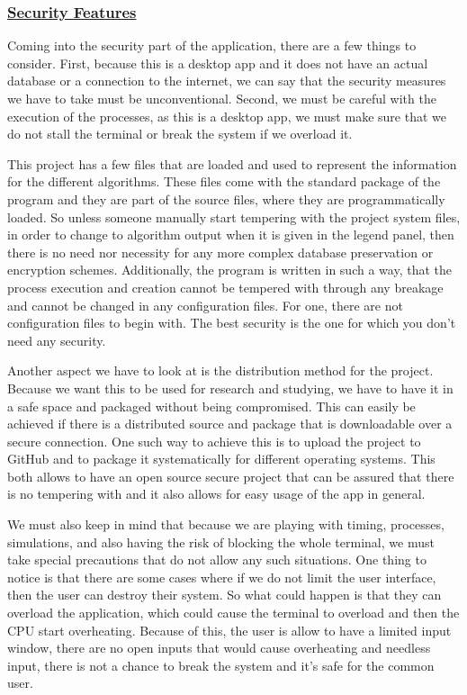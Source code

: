 \documentclass{article}
\begin{document}
\subsubsection{\underline{Security Features}}

Coming into the security part of the application, there are a few things to consider. First, because this is a desktop app and it does not have an actual database or a connection to the internet, we can say that the security measures we have to take must be unconventional. Second, we must be careful with the execution of the processes, as this is a desktop app, we must make sure that we do not stall the terminal or break the system if we overload it.

This project has a few files that are loaded and used to represent the information for the different algorithms. These files come with the standard package of the program and they are part of the source files, where they are programmatically loaded. So unless someone manually start tempering with the project system files, in order to change to algorithm output when it is given in the legend panel, then there is no need nor necessity for any more complex database preservation or encryption schemes. Additionally, the program is written in such a way, that the process execution and creation cannot be tempered with through any breakage and cannot be changed in any configuration files. For one, there are not configuration files to begin with. The best security is the one for which you don't need any security.

Another aspect we have to look at is the distribution method for the project. Because we want this to be used for research and studying, we have to have it in a safe space and packaged without being compromised. This can easily be achieved if there is a distributed source and package that is downloadable over a secure connection. One such way to achieve this is to upload the project to GitHub and to package it systematically for different operating systems. This both allows to have an open source secure project that can be assured that there is no tempering with and it also allows for easy usage of the app in general.

We must also keep in mind that because we are playing with timing, processes, simulations, and also having the risk of blocking the whole terminal, we must take special precautions that do not allow any such situations. One thing to notice is that there are some cases where if we do not limit the user interface, then the user can destroy their system. So what could happen is that they can overload the application, which could cause the terminal to overload and then the CPU start overheating. Because of this, the user is allow to have a limited input window, there are no open inputs that would cause overheating and needless input, there is not a chance to break the system and it's safe for the common user.
\end{document}
